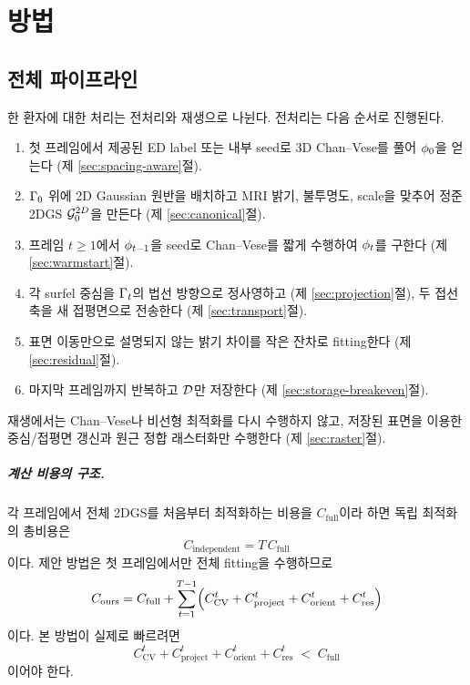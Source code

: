 \chapter{방법}
\label{ch:method}

\section{전체 파이프라인}
\label{sec:pipeline}

한 환자에 대한 처리는 전처리와 재생으로 나뉜다. 전처리는 다음 순서로 진행된다.

\begin{enumerate}[leftmargin=2.2em]
  \item 첫 프레임에서 제공된 ED label 또는 내부 seed로 3D Chan--Vese를 풀어
  $\phi_0$을 얻는다 (제 \ref{sec:spacing-aware}절).
  \item $\Gamma_0$ 위에 2D Gaussian 원반을 배치하고 MRI 밝기, 불투명도, scale을
  맞추어 정준 2DGS $\mathcal{G}^{2D}_0$을 만든다 (제 \ref{sec:canonical}절).
  \item 프레임 $t \ge 1$에서 $\phi_{t-1}$을 seed로 Chan--Vese를 짧게 수행하여
  $\phi_t$를 구한다 (제 \ref{sec:warmstart}절).
  \item 각 surfel 중심을 $\Gamma_t$의 법선 방향으로 정사영하고 (제
  \ref{sec:projection}절), 두 접선축을 새 접평면으로 전송한다 (제
  \ref{sec:transport}절).
  \item 표면 이동만으로 설명되지 않는 밝기 차이를 작은 잔차로 fitting한다
  (제 \ref{sec:residual}절).
  \item 마지막 프레임까지 반복하고 $\mathcal{D}$만 저장한다 (제
  \ref{sec:storage-breakeven}절).
\end{enumerate}

재생에서는 Chan--Vese나 비선형 최적화를 다시 수행하지 않고, 저장된 표면을 이용한
중심/접평면 갱신과 원근 정합 래스터화만 수행한다 (제 \ref{sec:raster}절).

\paragraph{계산 비용의 구조.}
각 프레임에서 전체 2DGS를 처음부터 최적화하는 비용을 $C_{\mathrm{full}}$이라 하면
독립 최적화의 총비용은
\begin{equation}
  C_{\mathrm{independent}} = T\,C_{\mathrm{full}}
  \label{eq:cost-independent}
\end{equation}
이다. 제안 방법은 첫 프레임에서만 전체 fitting을 수행하므로
\begin{equation}
  C_{\mathrm{ours}} = C_{\mathrm{full}}
  + \sum_{t=1}^{T-1}\Bigl(C^t_{\mathrm{CV}} + C^t_{\mathrm{project}}
  + C^t_{\mathrm{orient}} + C^t_{\mathrm{res}}\Bigr)
  \label{eq:cost-ours}
\end{equation}
이다. 본 방법이 실제로 빠르려면
\begin{equation}
  C^t_{\mathrm{CV}} + C^t_{\mathrm{project}} + C^t_{\mathrm{orient}}
  + C^t_{\mathrm{res}} \;<\; C_{\mathrm{full}}
  \label{eq:cost-hypothesis}
\end{equation}
이어야 한다.

